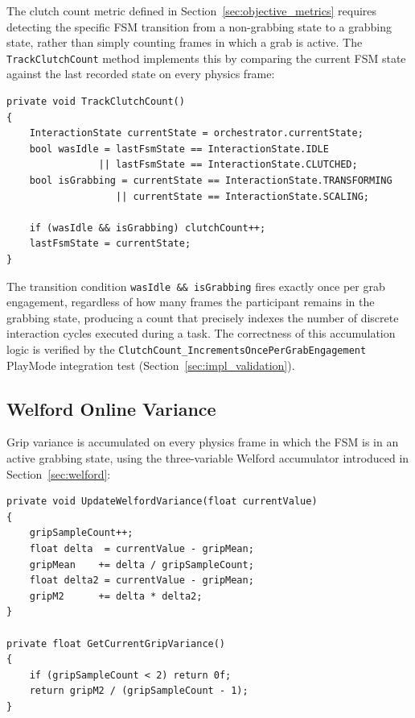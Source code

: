 The clutch count metric defined in Section~\ref{sec:objective_metrics} requires detecting the specific FSM transition from a non-grabbing state to a grabbing state, rather than simply counting frames in which a grab is active. The \texttt{TrackClutchCount} method implements this by comparing the current FSM state against the last recorded state on every physics frame:

\begin{lstlisting}[language={[Sharp]C}, caption={Clutch count accumulation
in \texttt{SessionTelemetryLogger.TrackClutchCount}.},
label={lst:clutch}]
private void TrackClutchCount()
{
    InteractionState currentState = orchestrator.currentState;
    bool wasIdle = lastFsmState == InteractionState.IDLE
                || lastFsmState == InteractionState.CLUTCHED;
    bool isGrabbing = currentState == InteractionState.TRANSFORMING
                   || currentState == InteractionState.SCALING;

    if (wasIdle && isGrabbing) clutchCount++;
    lastFsmState = currentState;
}
\end{lstlisting}

The transition condition \texttt{wasIdle \&\& isGrabbing} fires exactly once per grab engagement, regardless of how many frames the participant remains in the grabbing state, producing a count that precisely indexes the number of discrete interaction cycles executed during a task. The correctness of this accumulation logic is verified by the \texttt{ClutchCount\_IncrementsOncePerGrabEngagement} PlayMode integration test (Section~\ref{sec:impl_validation}).


\subsection{Welford Online Variance}
\label{sec:welford_impl}

Grip variance is accumulated on every physics frame in which the FSM is in an active grabbing state, using the three-variable Welford accumulator introduced in Section~\ref{sec:welford}:

\begin{lstlisting}[language={[Sharp]C}, caption={Welford online variance
accumulation in \texttt{SessionTelemetryLogger.UpdateWelfordVariance}.},
label={lst:welford}]
private void UpdateWelfordVariance(float currentValue)
{
    gripSampleCount++;
    float delta  = currentValue - gripMean;
    gripMean    += delta / gripSampleCount;
    float delta2 = currentValue - gripMean;
    gripM2      += delta * delta2;
}

private float GetCurrentGripVariance()
{
    if (gripSampleCount < 2) return 0f;
    return gripM2 / (gripSampleCount - 1);
}
\end{lstlisting}


